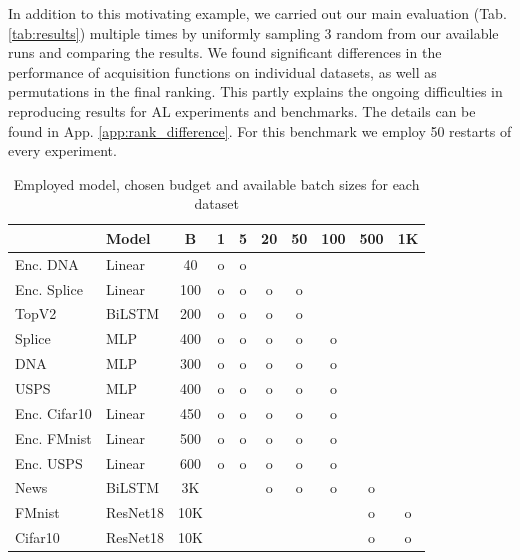 \documentclass[]{article}
\begin{document}
In addition to this motivating example, we carried out our main evaluation (Tab. \ref{tab:results}) multiple times by uniformly sampling 3 random from our available runs and comparing the results.
We found significant differences in the performance of acquisition functions on individual datasets, as well as permutations in the final ranking.
This partly explains the ongoing difficulties in reproducing results for AL experiments and benchmarks.
The details can be found in App. \ref{app:rank_difference}.
For this benchmark we employ 50 restarts of every experiment.
\begin{table}
	\vspace{-0.7cm}
	\caption{Employed model, chosen budget and available batch sizes for each dataset}
	\vspace{0.1cm}
	\label{tab:batch_sizes}
	{\scriptsize
		\begin{tabular}{l|l|c|c|c|c|c|c|c|c}
			& Model  & B & 1 & 5 & 20 & 50 & 100 & 500 & 1K \\
			\hline
			Enc. DNA    & Linear & 40 & o & o &&&&& \\
			Enc. Splice & Linear & 100 & o & o & o & o &&&\\
			TopV2       & BiLSTM & 200 & o & o & o & o &&& \\
			Splice      & MLP    & 400 & o & o & o & o & o && \\
			DNA         & MLP    & 300 & o & o & o & o & o && \\
			USPS        & MLP    & 400 & o & o & o & o & o && \\
			Enc. Cifar10& Linear & 450 & o & o & o & o & o && \\
			Enc. FMnist & Linear & 500 & o & o & o & o & o && \\
			Enc. USPS   & Linear & 600 & o & o & o & o & o && \\
			News        & BiLSTM & 3K &&& o & o & o & o &\\
			FMnist      & ResNet18& 10K &&&&&& o & o\\
			Cifar10     & ResNet18& 10K &&&&&& o & o \\
		\end{tabular}
	}
	\vspace{-0.55cm}
\end{table}


\end{document}
